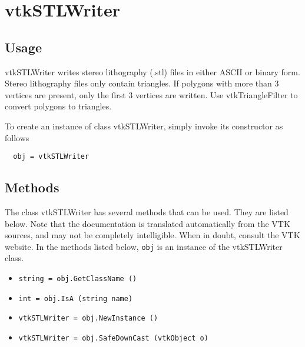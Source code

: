 \section{vtkSTLWriter}

\subsection{Usage}

 vtkSTLWriter writes stereo lithography (.stl) files in either ASCII or
 binary form. Stereo lithography files only contain triangles. If polygons
 with more than 3 vertices are present, only the first 3 vertices are
 written.  Use vtkTriangleFilter to convert polygons to triangles.

To create an instance of class vtkSTLWriter, simply
invoke its constructor as follows
\begin{verbatim}
  obj = vtkSTLWriter
\end{verbatim}
\subsection{Methods}

The class vtkSTLWriter has several methods that can be used.
  They are listed below.
Note that the documentation is translated automatically from the VTK sources,
and may not be completely intelligible.  When in doubt, consult the VTK website.
In the methods listed below, \verb|obj| is an instance of the vtkSTLWriter class.
\begin{itemize}
\item  \verb|string = obj.GetClassName ()|

\item  \verb|int = obj.IsA (string name)|

\item  \verb|vtkSTLWriter = obj.NewInstance ()|

\item  \verb|vtkSTLWriter = obj.SafeDownCast (vtkObject o)|

\end{itemize}
